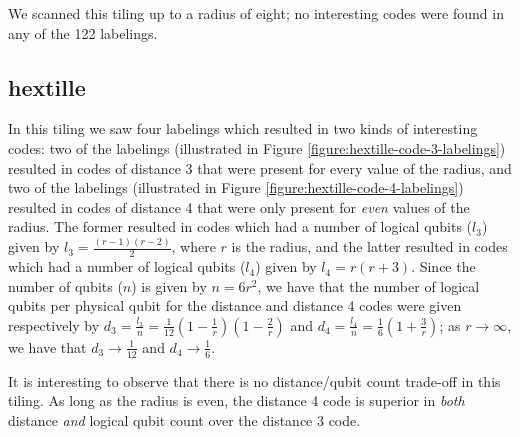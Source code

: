 \documentclass[12pt]{amsbook}
\theoremstyle{plain}
\theoremstyle{definition}
\theoremstyle{remark}
\newcommand{\paren}[1]{\left(#1\right)}
\begin{document}
We scanned this tiling up to a radius of eight;  no interesting codes were found in any of the 122 labelings.
\subsection{hextille}

In this tiling we saw four labelings which resulted in two kinds of interesting codes:  two of the labelings (illustrated in Figure \ref{figure:hextille-code-3-labelings}) resulted in codes of distance 3 that were present for every value of the radius, and two of the labelings (illustrated in Figure \ref{figure:hextille-code-4-labelings}) resulted in codes of distance 4 that were only present for \emph{even} values of the radius.  The former resulted in codes which had a number of logical qubits ($l_3$) given by $l_3=\frac{(r-1)(r-2)}{2}$, where $r$ is the radius, and the latter resulted in codes which had a number of logical qubits ($l_4$) given by $l_4=r(r+3)$.  Since the number of qubits ($n$) is given by $n=6r^2$, we have that the number of logical qubits per physical qubit for the distance and distance 4 codes were given respectively by $d_3=\frac{l_3}{n}=\frac{1}{12}\paren{1-\frac{1}{r}}\paren{1-\frac{2}{r}}$ and $d_4=\frac{l_4}{n}=\frac{1}{6}\paren{1+\frac{3}{r}}$;  as $r\to\infty$, we have that $d_3\to\frac{1}{12}$ and $d_4\to\frac{1}{6}$.

It is interesting to observe that there is no distance/qubit count trade-off in this tiling.  As long as the radius is even, the distance 4 code is superior in \emph{both} distance \emph{and} logical qubit count over the distance 3 code.
\end{document}
